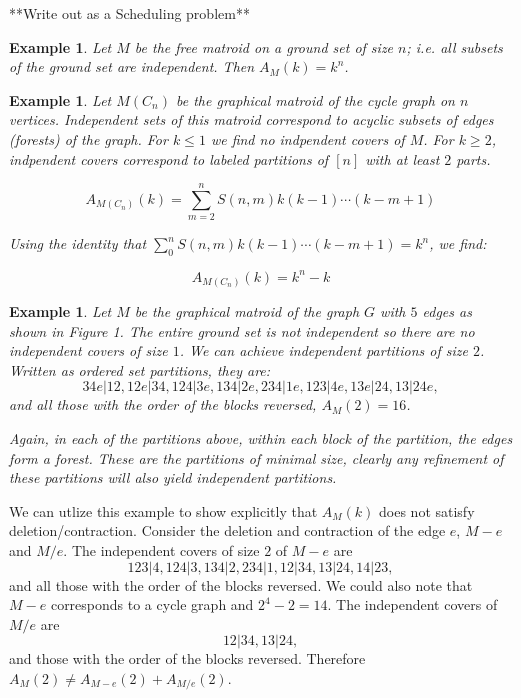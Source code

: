 \documentclass[12pt]{amsart}
\newtheorem{example}[definition]{Example}
\begin{document}
**Write out as a  Scheduling problem**

\begin{example}

Let $M$ be the free matroid on a ground set of size $n$; i.e. all subsets of the ground set are independent.  Then $A_M(k) = k^n$.  

\end{example}

\begin{example}

Let $M(C_n)$ be the graphical matroid of the cycle graph on $n$
vertices.  Independent sets of this matroid correspond to acyclic
subsets of edges (forests) of the graph.  For $k \leq 1$ we find no
indpendent covers of $M$.  For $k \geq 2$, indpendent covers
correspond to labeled partitions of $[n]$ with at least $2$ parts.

$$A_{M(C_n)}(k) = \sum_{m=2}^{n} S(n,m) k(k-1) \cdots (k-m+1) $$

Using the identity that $\sum_0^n S(n,m) k(k-1) \cdots (k-m+1) = k^n$, we find:

$$A_{M(C_n)}(k) = k^n - k $$

\end{example}



\begin{example}
Let $M$ be the graphical matroid of the graph $G$ with $5$ edges as
shown in Figure 1.  The entire ground set is not independent so there
are no independent covers of size $1$.  We can achieve independent
partitions of size $2$.  Written as ordered set partitions, they are:
$$ 34e|12, 12e|34, 124|3e, 134|2e, 234|1e, 123|4e, 13e|24, 13|24e, $$
and all those with the order of the blocks reversed, $A_M(2) = 16$.  

Again, in each of the partitions above, within each block of the
partition, the edges form a forest.  These are the partitions of
minimal size, clearly any refinement of these partitions will also
yield independent partitions.

\end{example}

We can utlize this example to show explicitly that $A_M(k)$ does not
satisfy deletion/contraction.  Consider the deletion and contraction
of the edge $e$, $M-e$ and $M/e$.  The independent covers of size $2$
of $M-e$ are
$$ 123|4, 124|3, 134|2, 234|1, 12|34, 13|24, 14|23, $$ and all those
with the order of the blocks reversed.  We could also note that $M-e$
corresponds to a cycle graph and $2^4 - 2 = 14$.  The independent
covers of $M/e$ are $$12|34, 13|24,$$ and those with the order of the
blocks reversed.  Therefore $A_M(2) \neq A_{M-e}(2) + A_{M/e}(2)$.
\end{document}
